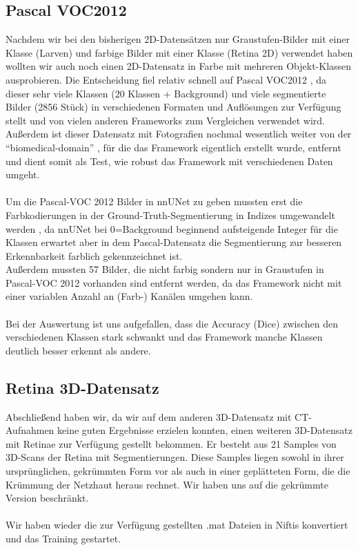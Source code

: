 \subsection{Pascal VOC2012}
Nachdem wir bei den bisherigen 2D-Datensätzen nur Graustufen-Bilder mit einer Klasse (Larven) und farbige Bilder mit einer Klasse (Retina 2D) verwendet haben wollten wir auch noch einen 2D-Datensatz in Farbe mit mehreren Objekt-Klassen ausprobieren. Die Entscheidung fiel relativ schnell auf Pascal VOC2012 \cite{PascalVOCDatensatz}, da dieser sehr viele Klassen (20 Klassen + Background) und viele segmentierte Bilder (2856 Stück) in verschiedenen Formaten und Auflösungen zur Verfügung stellt und von vielen anderen Frameworks zum Vergleichen verwendet wird. Außerdem ist dieser Datensatz mit Fotografien nochmal wesentlich weiter von der \enquote{biomedical-domain} \cite{nnunetGithub2D-Daten}, für die das Framework eigentlich erstellt wurde, entfernt und dient somit als Test, wie robust das Framework mit verschiedenen Daten umgeht.\\\\
Um die Pascal-VOC 2012 Bilder in nnUNet zu geben mussten erst die Farbkodierungen in der Ground-Truth-Segmentierung in Indizes umgewandelt werden \cite{autoMLGithub}, da nnUNet bei 0=Background beginnend aufsteigende Integer für die Klassen erwartet aber in dem Pascal-Datensatz \cite{PascalVOCDatensatz} die Segmentierung zur besseren Erkennbarkeit farblich gekennzeichnet ist.\\
Außerdem mussten 57 Bilder, die nicht farbig sondern nur in Graustufen in Pascal-VOC 2012 \cite{PascalVOCDatensatz} vorhanden sind entfernt werden, da das Framework nicht mit einer variablen Anzahl an (Farb-) Kanälen umgehen kann.\\\\

Bei der Auswertung ist uns aufgefallen, dass die Accuracy (Dice) zwischen den verschiedenen Klassen stark schwankt und das Framework manche Klassen deutlich besser erkennt als andere. 

\subsection{Retina 3D-Datensatz}
Abschließend haben wir, da wir auf dem anderen 3D-Datensatz mit CT-Aufnahmen  keine guten Ergebnisse erzielen konnten, einen weiteren 3D-Datensatz mit Retinae zur Verfügung gestellt bekommen. Er besteht aus 21 Samples von 3D-Scans der Retina mit Segmentierungen. Diese Samples liegen sowohl in ihrer ursprünglichen, gekrümmten Form vor als auch in einer geplätteten Form, die die Krümmung der Netzhaut heraus rechnet. Wir haben uns auf die gekrümmte Version beschränkt.\\\\
Wir haben wieder die zur Verfügung gestellten .mat Dateien in Niftis konvertiert \cite{autoMLGithub} und das Training gestartet.




